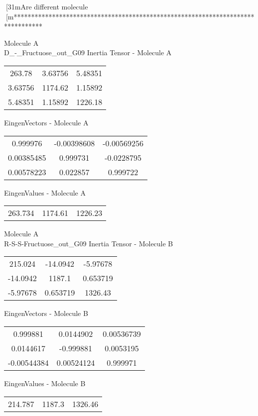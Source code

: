 [31mAre different molecule
[m********************************************************************************
\newpage
\begin{multicols}{2}
\begin{center}
Molecule A \\ 
D_-_Fructuose_out_G09
Inertia Tensor - Molecule A \\
\vtab
\begin{tabular}{|c c c|}
263.78	 & 	3.63756	 & 	5.48351	 \\
3.63756	 & 	1174.62	 & 	1.15892	 \\
5.48351	 & 	1.15892	 & 	1226.18
\end{tabular}

\vtab
 EingenVectors - Molecule A     \\
\vtab
\begin{tabular}{|c c c|}
0.999976	 & 	-0.00398608	 & 	-0.00569256	 \\
0.00385485	 & 	0.999731	 & 	-0.0228795	 \\
0.00578223	 & 	0.022857	 & 	0.999722
\end{tabular}

\vtab
 EingenValues - Molecule A     \\
\vtab
\begin{tabular}{|c c c|}
263.734	 & 	1174.61	 & 	1226.23
\end{tabular}
\columnbreak
Molecule A \\ 
R-S-S-Fructuose_out_G09
Inertia Tensor - Molecule B \\
\vtab
\begin{tabular}{|c c c|}
215.024	 & 	-14.0942	 & 	-5.97678	 \\
-14.0942	 & 	1187.1	 & 	0.653719	 \\
-5.97678	 & 	0.653719	 & 	1326.43
\end{tabular}

\vtab
 EingenVectors - Molecule B     \\
\vtab
\begin{tabular}{|c c c|}
0.999881	 & 	0.0144902	 & 	0.00536739	 \\
0.0144617	 & 	-0.999881	 & 	0.0053195	 \\
-0.00544384	 & 	0.00524124	 & 	0.999971
\end{tabular}

\vtab
 EingenValues - Molecule B     \\
\vtab
\begin{tabular}{|c c c|}
214.787	 & 	1187.3	 & 	1326.46
\end{tabular}
\end{center}
\end{multicols}
